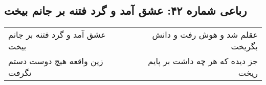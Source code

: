 \begin{center}
\section*{رباعی شماره ۴۲: عشق آمد و گرد فتنه بر جانم بیخت}
\label{sec:sh042}
\begin{longtable}{l p{0.5cm} r}
عشق آمد و گرد فتنه بر جانم بیخت
&&
عقلم شد و هوش رفت و دانش بگریخت
\\
زین واقعه هیچ دوست دستم نگرفت
&&
جز دیده که هر چه داشت بر پایم ریخت
\\
\end{longtable}
\end{center}
